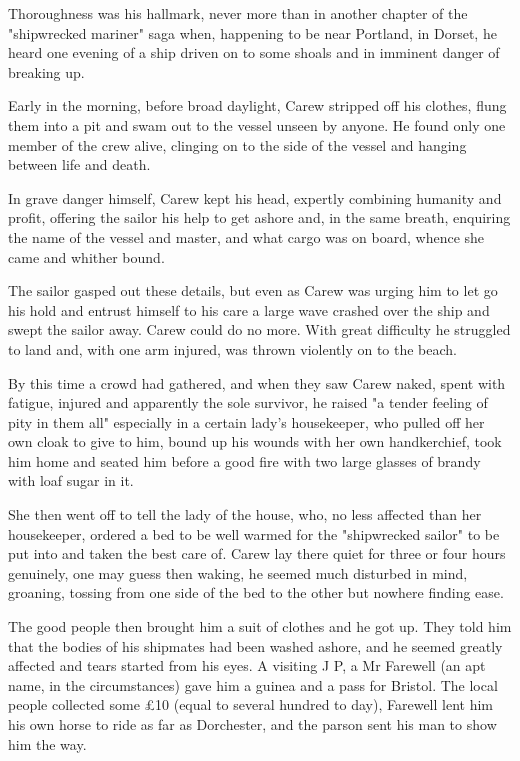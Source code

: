 Thoroughness was his hallmark, never more than in another chapter of the "shipwrecked mariner" saga when, happening to be near Portland, in Dorset, he heard one evening of a ship driven on to some shoals and in imminent danger of breaking up.

Early in the morning, before broad daylight, Carew stripped off his clothes, flung them into a pit and swam out to the vessel unseen by anyone. He found only one member of the crew alive, clinging on to the side of the vessel and hanging between life and death.

In grave danger himself, Carew kept his head, expertly combining humanity and profit, offering the sailor his help to get ashore and, in the same breath, enquiring the name of the vessel and master, and what cargo was on board, whence she came and whither bound.

The sailor gasped out these details, but even as Carew was urging him to let go his hold and entrust himself to his care a large wave crashed over the ship and swept the sailor away. Carew could do no more. With great difficulty he struggled to land and, with one arm injured, was thrown violently on to the beach.

By this time a crowd had gathered, and when they saw Carew naked, spent with fatigue, injured and apparently the sole survivor, he raised "a tender feeling of pity in them all"   especially in a certain lady's housekeeper, who pulled off her own cloak to give to him, bound up his wounds with her own handkerchief, took him home and seated him before a good fire with two large glasses of brandy with loaf sugar in it.

She then went off to tell the lady of the house, who, no less affected than her housekeeper, ordered a bed to be well warmed for the "shipwrecked sailor" to be put into and taken the best care of. Carew lay there quiet for three or four hours   genuinely, one may guess   then waking, he seemed much disturbed in mind, groaning, tossing from one side of the bed to the other but nowhere finding ease.

The good people then brought him a suit of clothes and he got up. They told him that the bodies of his shipmates had been washed ashore, and he seemed greatly affected and tears started from his eyes. A visiting J P, a Mr Farewell (an apt name, in the circumstances) gave him a guinea and a pass for Bristol. The local people collected some £10 (equal to several hundred to day), Farewell lent him his own horse to ride as far as Dorchester, and the parson sent his man to show him the way.

